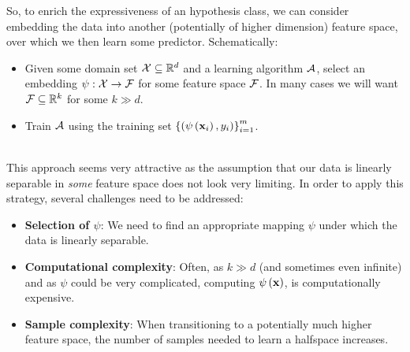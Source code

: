 So, to enrich the expressiveness of an hypothesis class, we can consider embedding the data into another (potentially of higher dimension) feature space, over which we then learn some predictor. Schematically:
\begin{itemize}
	\item Given some domain set $\mathcal{X}\subseteq\mathbb{R}^d$ and a learning algorithm $\mathcal{A}$, select an embedding  $\psi:\mathcal{X}\rightarrow\mathcal{F}$ for some feature space $\mathcal{F}$. In many cases we will want $\mathcal{F}\subseteq \mathbb{R}^k$ for some $k \gg d$.
	\item Train $\mathcal{A}$ using the training set $\left\{\left(\psi\left(\mathbf{x}_i\right),y_i\right)\right\}^m_{i=1}$.
\end{itemize}~\\

This approach seems very attractive as the assumption that our data is linearly separable in \textit{some} feature space does not look very limiting. In order to apply this strategy, several challenges need to be addressed:
\begin{itemize}
	\item \textbf{Selection of $\psi$}: We need to find an appropriate mapping $\psi$ under which the data is linearly separable.
	\item \textbf{Computational complexity}:  Often, as $k\gg d$ (and sometimes even infinite) and as $\psi$ could be very complicated, computing $\psi\left(\mathbf{x}\right)$, is computationally expensive.
	\item \textbf{Sample complexity}: When transitioning to a potentially much higher feature space, the number of samples needed to learn a halfspace increases. 
\end{itemize}
~\\
